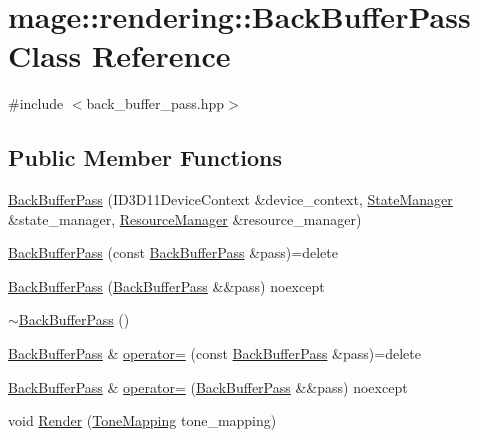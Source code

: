\hypertarget{classmage_1_1rendering_1_1_back_buffer_pass}{}\section{mage\+:\+:rendering\+:\+:Back\+Buffer\+Pass Class Reference}
\label{classmage_1_1rendering_1_1_back_buffer_pass}


{\ttfamily \#include $<$back\+\_\+buffer\+\_\+pass.\+hpp$>$}

\subsection*{Public Member Functions}
\begin{DoxyCompactItemize}
\item 
\hyperlink{classmage_1_1rendering_1_1_back_buffer_pass_a054aad27e4b3d05baf235ae256934ef2}{Back\+Buffer\+Pass} (I\+D3\+D11\+Device\+Context \&device\+\_\+context, \hyperlink{classmage_1_1rendering_1_1_state_manager}{State\+Manager} \&state\+\_\+manager, \hyperlink{classmage_1_1rendering_1_1_resource_manager}{Resource\+Manager} \&resource\+\_\+manager)
\item 
\hyperlink{classmage_1_1rendering_1_1_back_buffer_pass_aa8042001dccc96e61b01a5775421a41d}{Back\+Buffer\+Pass} (const \hyperlink{classmage_1_1rendering_1_1_back_buffer_pass}{Back\+Buffer\+Pass} \&pass)=delete
\item 
\hyperlink{classmage_1_1rendering_1_1_back_buffer_pass_ac8dfbaabb766f4bfd61cfea8d01dd7dc}{Back\+Buffer\+Pass} (\hyperlink{classmage_1_1rendering_1_1_back_buffer_pass}{Back\+Buffer\+Pass} \&\&pass) noexcept
\item 
\hyperlink{classmage_1_1rendering_1_1_back_buffer_pass_a697a5e094cdcdf9f42dd2efdda957b57}{$\sim$\+Back\+Buffer\+Pass} ()
\item 
\hyperlink{classmage_1_1rendering_1_1_back_buffer_pass}{Back\+Buffer\+Pass} \& \hyperlink{classmage_1_1rendering_1_1_back_buffer_pass_acad71e5633ba37b1069c5a2ef9e6f704}{operator=} (const \hyperlink{classmage_1_1rendering_1_1_back_buffer_pass}{Back\+Buffer\+Pass} \&pass)=delete
\item 
\hyperlink{classmage_1_1rendering_1_1_back_buffer_pass}{Back\+Buffer\+Pass} \& \hyperlink{classmage_1_1rendering_1_1_back_buffer_pass_a79649b9316cb114bae032027406b4fe4}{operator=} (\hyperlink{classmage_1_1rendering_1_1_back_buffer_pass}{Back\+Buffer\+Pass} \&\&pass) noexcept
\item 
void \hyperlink{classmage_1_1rendering_1_1_back_buffer_pass_a368080bdfa9d1d345fc3392c53f536a9}{Render} (\hyperlink{namespacemage_1_1rendering_a789e4b7d9a8cc831b065e9c6bb7430e9}{Tone\+Mapping} tone\+\_\+mapping)
\end{DoxyCompactItemize}
